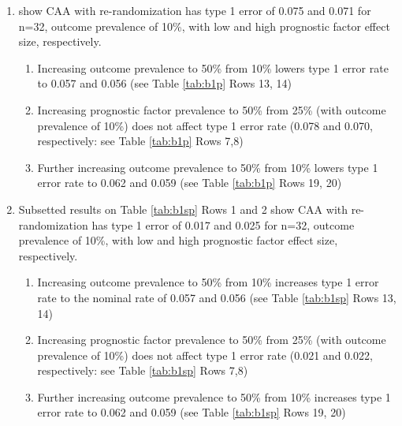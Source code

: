 \begin{enumerate}
	\item  show CAA with re-randomization has type 1 error of 0.075 and 0.071 for n=32, outcome prevalence of 10\%, with low and high prognostic factor effect size, respectively.
	\begin{enumerate}
		\item Increasing outcome prevalence to 50\% from 10\% lowers type 1 error rate to 0.057 and 0.056 (see Table \ref{tab:b1p} Rows 13, 14)
		\item Increasing prognostic factor prevalence to 50\% from 25\% (with outcome prevalence of 10\%) does not affect type 1 error rate (0.078 and 0.070, respectively: see Table \ref{tab:b1p} Rows 7,8)
		\item Further increasing outcome prevalence to 50\% from 10\% lowers type 1 error rate to 0.062 and 0.059 (see Table \ref{tab:b1p} Rows 19, 20)
	\end{enumerate}
	\item Subsetted results on Table \ref{tab:b1sp} Rows 1 and 2 show CAA with re-randomization has type 1 error of 0.017 and 0.025 for n=32, outcome prevalence of 10\%, with low and high prognostic factor effect size, respectively.
	\begin{enumerate}
		\item Increasing outcome prevalence to 50\% from 10\% increases type 1 error rate to the nominal rate of 0.057 and 0.056 (see Table \ref{tab:b1sp} Rows 13, 14)
		\item Increasing prognostic factor prevalence to 50\% from 25\% (with outcome prevalence of 10\%) does not affect type 1 error rate (0.021 and 0.022, respectively: see Table \ref{tab:b1sp} Rows 7,8)
		\item Further increasing outcome prevalence to 50\% from 10\% increases type 1 error rate to 0.062 and 0.059 (see Table \ref{tab:b1sp} Rows 19, 20)
	\end{enumerate}
\end{enumerate}

